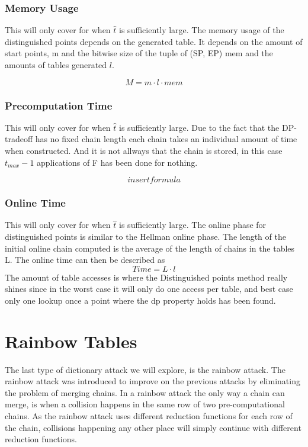 \subsubsection{Memory Usage}
This will only cover for when $\hat{t}$ is sufficiently large.
The memory usage of the distinguished points depends on the generated table. It depends on the amount of start points, m and the bitwise size of the tuple of (SP, EP) mem and the amounts of tables generated $l$.

\begin{equation}
  M=m\cdot l \cdot mem
\end{equation}

\subsubsection{Precomputation Time}
This will only cover for when $\hat{t}$ is sufficiently large.
Due to the fact that the DP-tradeoff has no fixed chain length each chain takes an individual amount of time when constructed. And it is not allways that the chain is stored, in this case $t_{max}-1$ applications of F has been done for nothing.

\begin{equation}
  insert formula
\end{equation}

\subsubsection{Online Time}
This will only cover for when $\hat{t}$ is sufficiently large.
The online phase for distinguished points is similar to the Hellman
online phase. The length of the initial online chain computed is the
average of the length of chains in the tables L. The online time can
then be described as
\begin{equation}
  Time=L\cdot l
\end{equation}
The amount of table accesses is where the Distinguished points method really shines since in the worst case it will only do one access per table, and best case only one lookup once a point where the dp property holds has been found.

\section{Rainbow Tables}
\label{sec:raintheory}

The last type of dictionary attack we will explore, is the rainbow
attack. The rainbow attack was introduced to improve on the previous
attacks by eliminating the problem of merging chains. In a rainbow
attack the only way a chain can merge, is when a collision happens in
the same row of two pre-computational chains. As the rainbow attack uses different
reduction functions for each row of the chain, collisions happening
any other place will simply continue with different reduction
functions.


